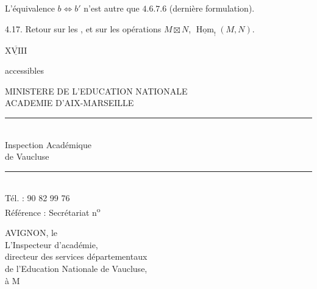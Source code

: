 
L'équivalence $b\Longleftrightarrow b'$ n'est autre que $4.6.7.6$ (dernière formulation).



4.17. Retour sur les , et sur les opérations $M\boxtimes N$, $\underline{\operatorname{Hom}}_!(M,N)$.


$\overline{\underline{\mathrm{XVIII}}}$

 accessibles

 



\noindent\begin{minipage}[t]{.48\linewidth}\centering
MINISTERE DE L'EDUCATION NATIONALE\\
ACADEMIE D'AIX-MARSEILLE\\
\rule{1.2cm}{0.3pt}\\
Inspection Académique\\
de Vaucluse\\
\rule{1.2cm}{0.3pt}\\
Tél. : 90 82 99 76\\
Référence : Secrétariat n\textsuperscript{o}
\end{minipage}\hfill
\begin{minipage}[t]{.48\linewidth}
AVIGNON, le\\[1ex]
L'Inspecteur d'académie,\\
directeur des services départementaux\\
de l'Education Nationale de Vaucluse,\\[1ex]
à M
\end{minipage}



